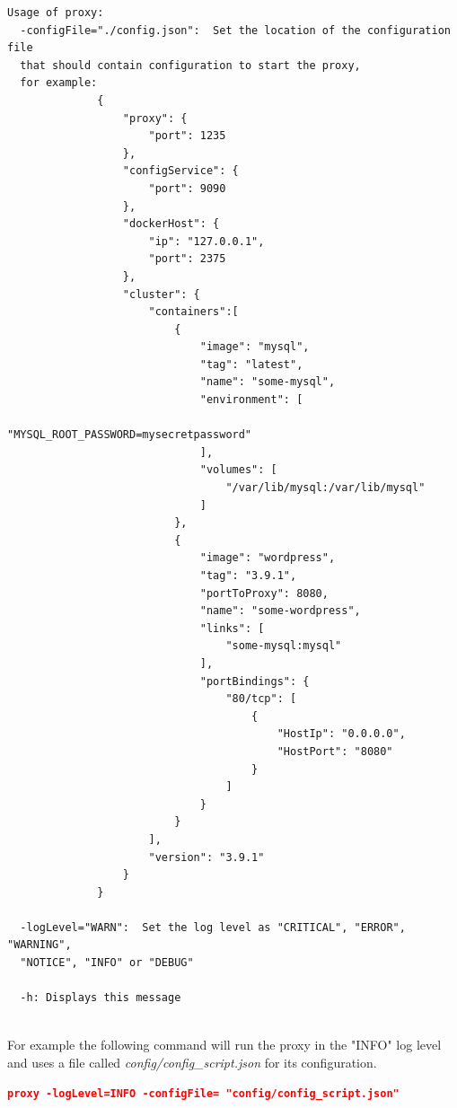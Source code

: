 \documentclass[a4paper,11pt,twoside]{report}
\begin{document}
\begin{lstlisting}[language=terminal]
Usage of proxy:
  -configFile="./config.json":  Set the location of the configuration file 
  that should contain configuration to start the proxy, 
  for example:
              {
                  "proxy": {
                      "port": 1235
                  },
                  "configService": {
                      "port": 9090
                  },
                  "dockerHost": {
                      "ip": "127.0.0.1",
                      "port": 2375
                  },
                  "cluster": {
                      "containers":[
                          {
                              "image": "mysql",
                              "tag": "latest",
                              "name": "some-mysql",
                              "environment": [
                                  "MYSQL_ROOT_PASSWORD=mysecretpassword"
                              ],
                              "volumes": [
                                  "/var/lib/mysql:/var/lib/mysql"
                              ]
                          },
                          {
                              "image": "wordpress",
                              "tag": "3.9.1",
                              "portToProxy": 8080,
                              "name": "some-wordpress",
                              "links": [
                                  "some-mysql:mysql"
                              ],
                              "portBindings": {
                                  "80/tcp": [
                                      {
                                          "HostIp": "0.0.0.0",
                                          "HostPort": "8080"
                                      }
                                  ]
                              }
                          }
                      ],
                      "version": "3.9.1"
                  }
              }

  -logLevel="WARN":  Set the log level as "CRITICAL", "ERROR", "WARNING", 
  "NOTICE", "INFO" or "DEBUG"

  -h: Displays this message
\end{lstlisting} 

\noindent\\
For example the following command will run the proxy in the "INFO" log level and uses a file called \textit{config/config\_script.json} for its configuration. 

\begin{lstlisting}[language=json]
proxy -logLevel=INFO -configFile= "config/config_script.json" 
\end{lstlisting}
 
\end{document}
